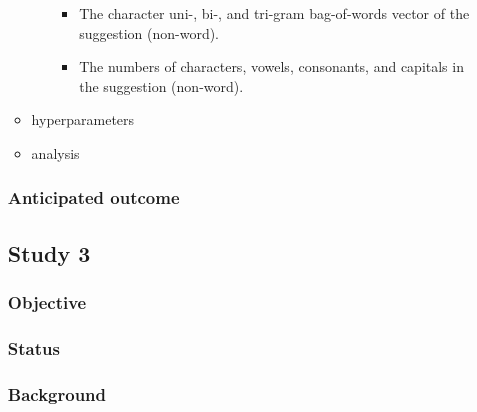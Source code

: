 \begin{itemize}
\begin{itemize}
\begin{itemize}
\begin{itemize}
                    \item The character uni-, bi-, and tri-gram bag-of-words vector of the suggestion (non-word).
                    \item The numbers of characters, vowels, consonants, and capitals in the suggestion (non-word).
                \end{itemize}
        \end{itemize}
    \item hyperparameters
    \item analysis
\end{itemize}


    

\subsubsection{Anticipated outcome}



\subsection{Study 3}
\label{sec:study3}

\subsubsection{Objective}



\subsubsection{Status} 


\subsubsection{Background} 



\end{itemize}
